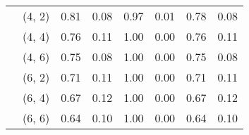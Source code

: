 \begin{tabular}{llrrrrrr}
    & (4, 2) &     0.81 & 0.08 &     0.97 & 0.01 &  0.78 & 0.08 \\
    & (4, 4) &     0.76 & 0.11 &     1.00 & 0.00 &  0.76 & 0.11 \\
    & (4, 6) &     0.75 & 0.08 &     1.00 & 0.00 &  0.75 & 0.08 \\
    & (6, 2) &     0.71 & 0.11 &     1.00 & 0.00 &  0.71 & 0.11 \\
    & (6, 4) &     0.67 & 0.12 &     1.00 & 0.00 &  0.67 & 0.12 \\
    & (6, 6) &     0.64 & 0.10 &     1.00 & 0.00 &  0.64 & 0.10 \\
\bottomrule
\end{tabular}
